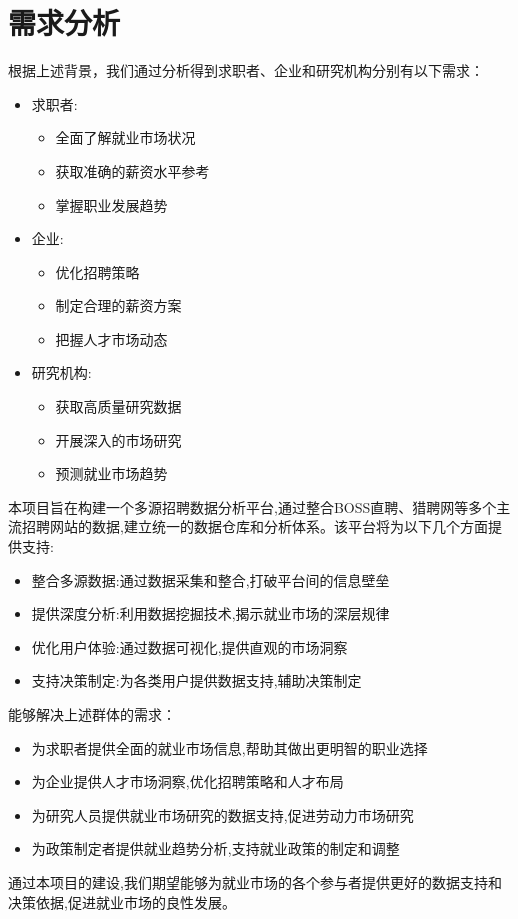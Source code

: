 \section{需求分析}

根据上述背景，我们通过分析得到求职者、企业和研究机构分别有以下需求：

\begin{itemize}
    \item 求职者:
    \begin{itemize}
        \item 全面了解就业市场状况
        \item 获取准确的薪资水平参考
        \item 掌握职业发展趋势
    \end{itemize}
    
    \item 企业:
    \begin{itemize}
        \item 优化招聘策略
        \item 制定合理的薪资方案
        \item 把握人才市场动态
    \end{itemize}
    
    \item 研究机构:
    \begin{itemize}
        \item 获取高质量研究数据
        \item 开展深入的市场研究
        \item 预测就业市场趋势
    \end{itemize}
\end{itemize}

本项目旨在构建一个多源招聘数据分析平台,通过整合BOSS直聘、猎聘网等多个主流招聘网站的数据,建立统一的数据仓库和分析体系。该平台将为以下几个方面提供支持:

\begin{itemize}
    \item 整合多源数据:通过数据采集和整合,打破平台间的信息壁垒
    \item 提供深度分析:利用数据挖掘技术,揭示就业市场的深层规律
    \item 优化用户体验:通过数据可视化,提供直观的市场洞察
    \item 支持决策制定:为各类用户提供数据支持,辅助决策制定
\end{itemize}

能够解决上述群体的需求：

\begin{itemize}
    \item 为求职者提供全面的就业市场信息,帮助其做出更明智的职业选择
    \item 为企业提供人才市场洞察,优化招聘策略和人才布局
    \item 为研究人员提供就业市场研究的数据支持,促进劳动力市场研究
    \item 为政策制定者提供就业趋势分析,支持就业政策的制定和调整
\end{itemize}


通过本项目的建设,我们期望能够为就业市场的各个参与者提供更好的数据支持和决策依据,促进就业市场的良性发展。